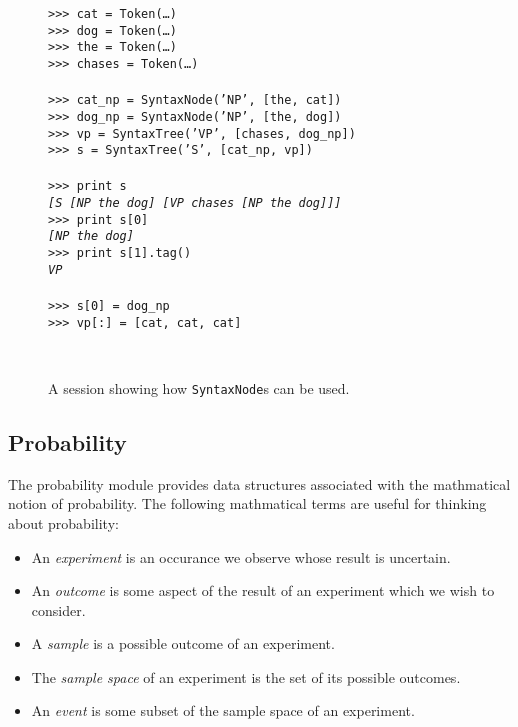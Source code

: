 \documentclass{article}
\begin{document}
\begin{figure}
\noindent
\begin{centering}
\begin{boxedminipage}{\textwidth}
\begin{tabbing}
\texttt{>>> cat = Token(\ldots)}\\
\texttt{>>> dog = Token(\ldots)}\\
\texttt{>>> the = Token(\ldots)}\\
\texttt{>>> chases = Token(\ldots)}\\
\\
\texttt{>>> cat\_np = SyntaxNode('NP', [the, cat])}\\
\texttt{>>> dog\_np = SyntaxNode('NP', [the, dog])}\\
\texttt{>>> vp = SyntaxTree('VP', [chases, dog\_np])}\\
\texttt{>>> s = SyntaxTree('S', [cat\_np, vp])}\\
\\
\texttt{>>> print s}\\
\texttt{\textit{[S [NP the dog] [VP chases [NP the dog]]]}}\\
\texttt{>>> print s[0]}\\
\texttt{\textit{[NP the dog]}}\\
\texttt{>>> print s[1].tag()}\\
\texttt{\textit{VP}}\\
\\
\texttt{>>> s[0] = dog\_np}\\
\texttt{>>> vp[:] = [cat, cat, cat]}\\
\end{tabbing}
\end{boxedminipage}\\
\end{centering}
 \caption[Example \texttt{SyntaxNode} use]
 {A session showing how \texttt{SyntaxNode}s can be used.}
\label{fig:syntaxnode}
\end{figure}

\subsection{Probability}

The probability module provides data structures associated with the
mathmatical notion of probability.  The following mathmatical terms
are useful for thinking about probability:

\begin{itemize}
  \item An \emph{experiment} is an occurance we observe whose result 
        is uncertain.
  \item An \emph{outcome} is some aspect of the result of an
        experiment which we wish to consider.
  \item A \emph{sample} is a possible outcome of an experiment.
  \item The \emph{sample space} of an experiment is the set of its
        possible outcomes.
  \item An \emph{event} is some subset of the sample space of an
        experiment. 
\end{itemize}
\end{document}
